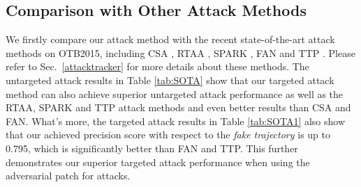 \documentclass[journal]{IEEEtran}
\renewcommand{\uline}{}
\begin{document}
\subsection{Comparison with Other Attack Methods}\label{SOTA}

We firstly compare our attack method with the recent state-of-the-art attack methods on OTB2015, including CSA \cite{CSA}, RTAA \cite{RTAA}, SPARK \cite{SPARK}, FAN \cite{FAN} and TTP \cite{TTP}. \uline{Please refer to Sec.~\ref{attacktracker} for more details about these methods. The untargeted attack results in Table \ref{tab:SOTA} show that our targeted attack method can also achieve superior untargeted attack performance as well as the RTAA, SPARK and TTP attack methods and even better results than CSA and FAN. What's more, the targeted attack results in Table \ref{tab:SOTA1} also show that our achieved precision score with respect to the \textit{fake trajectory} is up to 0.795, which is significantly better than FAN and TTP. This further demonstrates our superior targeted attack performance when using the adversarial patch for attacks.}
\end{document}
